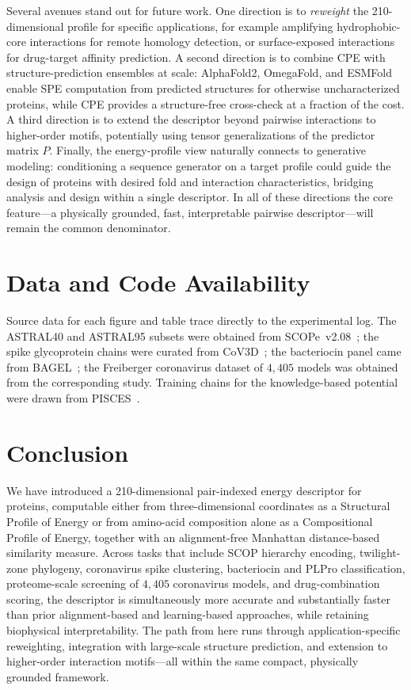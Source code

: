 \documentclass[11pt]{article}
\begin{document}
Several avenues stand out for future work. One direction is to
\emph{reweight} the 210-dimensional profile for specific applications, for
example amplifying hydrophobic-core interactions for remote homology
detection, or surface-exposed interactions for drug-target affinity
prediction. A second direction is to combine CPE with structure-prediction
ensembles at scale: AlphaFold2, OmegaFold, and ESMFold enable SPE
computation from predicted structures for otherwise uncharacterized
proteins, while CPE provides a structure-free cross-check at a fraction of
the cost. A third direction is to extend the descriptor beyond pairwise
interactions to higher-order motifs, potentially using tensor generalizations
of the predictor matrix $P$. Finally, the energy-profile view naturally
connects to generative modeling: conditioning a sequence generator on a
target profile could guide the design of proteins with desired fold
and interaction characteristics, bridging analysis and design within a
single descriptor. In all of these directions the core feature---a
physically grounded, fast, interpretable pairwise descriptor---will remain
the common denominator.

\section{Data and Code Availability}

Source data for each figure and table trace directly to the experimental
log. The ASTRAL40 and ASTRAL95 subsets were obtained from
SCOPe~v2.08~\citep{chandonia2019scope}; the spike glycoprotein chains
were curated from CoV3D~\citep{gowthaman2021cov3d}; the bacteriocin
panel came from BAGEL~\citep{alkhalili2018bagel}; the Freiberger
coronavirus dataset of $4{,}405$ models was obtained from the
corresponding study. Training chains for the knowledge-based potential
were drawn from PISCES~\citep{wang2003pisces}.

\section{Conclusion}

We have introduced a 210-dimensional pair-indexed energy descriptor for
proteins, computable either from three-dimensional coordinates as a
Structural Profile of Energy or from amino-acid composition alone as a
Compositional Profile of Energy, together with an alignment-free Manhattan
distance-based similarity measure. Across tasks that include SCOP
hierarchy encoding, twilight-zone phylogeny, coronavirus spike clustering,
bacteriocin and PLPro classification, proteome-scale screening of
$4{,}405$ coronavirus models, and drug-combination scoring, the descriptor
is simultaneously more accurate and substantially faster than prior
alignment-based and learning-based approaches, while retaining biophysical
interpretability. The path from here runs through application-specific
reweighting, integration with large-scale structure prediction, and
extension to higher-order interaction motifs---all within the same compact,
physically grounded framework.


\end{document}

